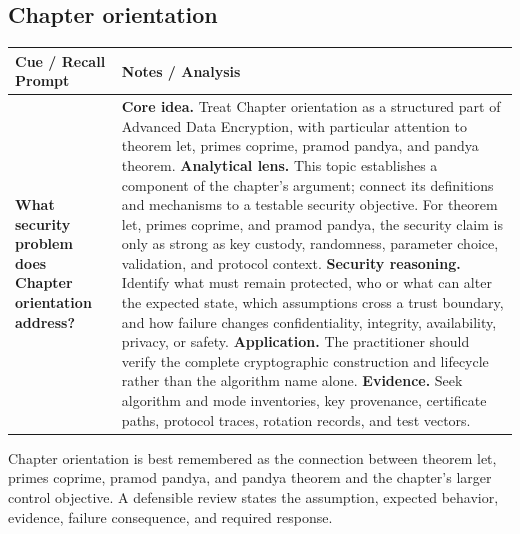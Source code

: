 \documentclass[11pt]{article}
\newcommand{\CornellHeader}{%
\rowcolor{Navy}\color{white}\bfseries Cue / Recall Prompt & \color{white}\bfseries Notes / Analysis\\\hline}
\newcommand{\CornellRow}[2]{%
\cellcolor{CueGray}\RaggedRight\textbf{#1} & \RaggedRight #2\\\hline}
\begin{document}
\subsection*{Chapter orientation}
\begin{longtable}{>{\RaggedRight\arraybackslash}p{}|>{\RaggedRight\arraybackslash}p{}}
\CornellHeader
\CornellRow{What security problem does Chapter orientation address?}{\textbf{Core idea.} Treat Chapter orientation as a structured part of Advanced Data Encryption, with particular attention to theorem let, primes coprime, pramod pandya, and pandya theorem. \textbf{Analytical lens.} This topic establishes a component of the chapter's argument; connect its definitions and mechanisms to a testable security objective. For theorem let, primes coprime, and pramod pandya, the security claim is only as strong as key custody, randomness, parameter choice, validation, and protocol context. \textbf{Security reasoning.} Identify what must remain protected, who or what can alter the expected state, which assumptions cross a trust boundary, and how failure changes confidentiality, integrity, availability, privacy, or safety. \textbf{Application.} The practitioner should verify the complete cryptographic construction and lifecycle rather than the algorithm name alone. \textbf{Evidence.} Seek algorithm and mode inventories, key provenance, certificate paths, protocol traces, rotation records, and test vectors.}
\end{longtable}
\begin{topicsummary}
Chapter orientation is best remembered as the connection between theorem let, primes coprime, pramod pandya, and pandya theorem and the chapter's larger control objective. A defensible review states the assumption, expected behavior, evidence, failure consequence, and required response.
\end{topicsummary}
\end{document}
